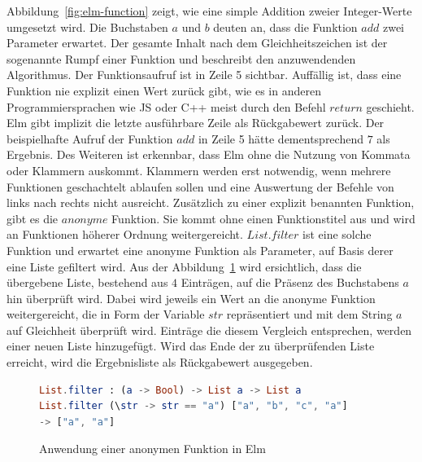 Abbildung~\ref{fig:elm-function} zeigt, wie eine simple Addition zweier Integer-Werte umgesetzt wird. Die Buchstaben $a$ und $b$ deuten an, dass die Funktion $add$ zwei Parameter erwartet. Der gesamte Inhalt nach dem Gleichheitszeichen ist der sogenannte Rumpf einer Funktion und beschreibt den anzuwendenden Algorithmus. Der Funktionsaufruf ist in Zeile 5 sichtbar. Auffällig ist, dass eine Funktion nie explizit einen Wert zurück gibt, wie es in anderen Programmiersprachen wie \ac{JS} oder C++ meist durch den Befehl $return$ geschieht. Elm gibt implizit die letzte ausführbare Zeile als Rückgabewert zurück. Der beispielhafte Aufruf der Funktion $add$ in Zeile 5 hätte dementsprechend $7$ als Ergebnis. Des Weiteren ist erkennbar, dass Elm ohne die Nutzung von Kommata oder Klammern auskommt. Klammern werden erst notwendig, wenn mehrere Funktionen geschachtelt ablaufen sollen und eine Auswertung der Befehle von links nach rechts nicht ausreicht.
Zusätzlich zu einer explizit benannten Funktion, gibt es die $anonyme$ Funktion. Sie kommt ohne einen Funktionstitel aus und wird an Funktionen höherer Ordnung weitergereicht.
$List.filter$ ist eine solche Funktion und erwartet eine anonyme Funktion als Parameter, auf Basis derer eine Liste gefiltert wird. Aus der Abbildung~\ref{fig:elm-anonym-function} wird ersichtlich, dass die übergebene Liste, bestehend aus $4$ Einträgen, auf die Präsenz des Buchstabens $a$ hin überprüft wird. Dabei wird jeweils ein Wert an die anonyme Funktion weitergereicht, die in Form der Variable $str$ repräsentiert und mit dem String $a$ auf Gleichheit überprüft wird. Einträge die diesem Vergleich entsprechen, werden einer neuen Liste hinzugefügt. Wird das Ende der zu überprüfenden Liste erreicht, wird die Ergebnisliste als Rückgabewert ausgegeben.
\begin{figure}[h]
\begin{lstlisting}[language=Elm]
List.filter : (a -> Bool) -> List a -> List a
List.filter (\str -> str == "a") ["a", "b", "c", "a"]
-> ["a", "a"]
\end{lstlisting}
\caption{Anwendung einer anonymen Funktion in Elm}\label{fig:elm-anonym-function}
\end{figure}
